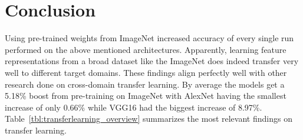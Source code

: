 \quad

\section{Conclusion}

Using pre-trained weights from ImageNet increased accuracy of every single run performed on the above mentioned architectures. Apparently, learning feature representations from a broad dataset like the ImageNet does indeed transfer very well to different target domains. These findings align perfectly well with other research done on cross-domain transfer learning. By average the models get a 5.18\% boost from pre-training on ImageNet with AlexNet having the smallest increase of only 0.66\% while VGG16 had the biggest increase of 8.97\%. Table~\ref{tbl:transferlearning_overview} summarizes the most relevant findings on transfer learning. \\

\begin{table}[!h] \centering
{}
\caption{Summary of transfer learning results. Only relevant results are shown that are used in the next chapter.}
\label{tbl:transferlearning_overview}
\end{table}

